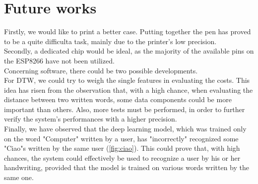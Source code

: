 \documentclass[8pt,notitlepage]{report}
\begin{document}
\chapter{Future works}

	Firstly, we would like to print a better case. Putting together the pen has proved to be a quite difficulta task, mainly due to the printer's low precision. \\
	Secondly, a dedicated chip would be ideal, as the majority of the available pins on the ESP8266 have not been utilized. \\
	Concerning software, there could be two possible developments. \\
	For DTW, we could try to weigh the single features in evaluating the costs. This idea has risen from the observation that, with a high chance, when evaluating the distance between two written words, some data components could be more important than others. Also, more tests must be performed, in order to further verify the system's performances with a higher precision. \\
	Finally, we have observed that the deep learning model, which was trained only on the word "Computer" written by a user, has "incorrectly" recognized some "Ciao"s written by the same user (\cref{fig:ciao}). This could prove that, with high chances, the system could effectively be used to recognize a user by his or her handwriting, provided that the model is trained on various words written by the same one.  
	
\end{document}
